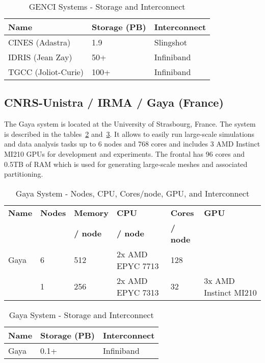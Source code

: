     \begin{table}[!ht]
        \centering
        \begin{tabular}{l l l}
        \toprule
        \textbf{Name} & \textbf{Storage (PB)} & \textbf{Interconnect} \\
        \midrule
        CINES (Adastra) & 1.9 & Slingshot \\
        IDRIS (Jean Zay) & 50+ & Infiniband \\
        TGCC (Joliot-Curie) & 100+ & Infiniband \\
        \bottomrule
        \end{tabular}
        \caption{GENCI Systems - Storage and Interconnect}
        \label{tab:genci_storage_interconnect}
    \end{table}

\subsection*{CNRS-Unistra / IRMA / Gaya (France)}
\label{sec:arch:gaya}

The Gaya system is located at the University of Strasbourg, France. The system is described in the tables~\ref{tab:gaya_flops_cpu_gpu} and~\ref{tab:gaya_storage_interconnect}. It allows to easily run large-scale simulations and data analysis tasks up to 6 nodes and 768 cores and includes 3 AMD Instinct MI210 GPUs for development and experiments.
The frontal has 96 cores and 0.5TB of RAM which is used for generating large-scale meshes and associated partitioning.

\begin{table}[!ht]
    \centering
    \begin{tabular}{l l l l l l}
    \toprule
    \textbf{Name} & \textbf{Nodes} & \textbf{Memory} & \textbf{CPU} & \textbf{Cores} & \textbf{GPU} \\
    &  & \textbf{/ node} & \textbf{/ node}  & \textbf{/ node} &  \\
    \midrule
    Gaya &  6  & 512 & 2x AMD EPYC 7713 & 128 &  \\
         &  1 & 256 & 2x AMD EPYC 7313 & 32 & 3x AMD Instinct MI210 \\
    \bottomrule
    \end{tabular}
    \caption{Gaya System - Nodes, CPU, Cores/node, GPU, and Interconnect}
    \label{tab:gaya_flops_cpu_gpu}
\end{table}

    \begin{table}[!ht]
        \centering
        \begin{tabular}{l l l}
        \toprule
        \textbf{Name} & \textbf{Storage (PB)} & \textbf{Interconnect} \\
        \midrule
        Gaya & 0.1+ & Infiniband \\
        \bottomrule
    \end{tabular}
    \caption{Gaya System - Storage and Interconnect}
    \label{tab:gaya_storage_interconnect}
    \end{table}

